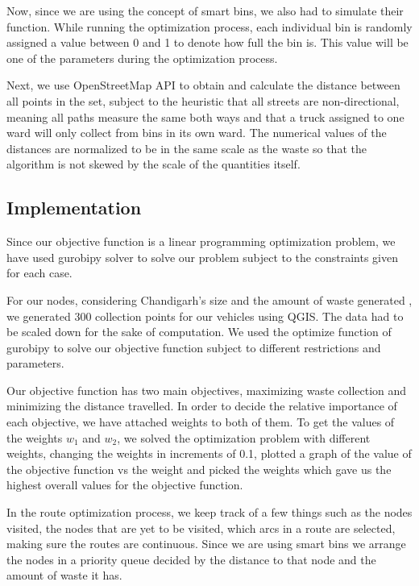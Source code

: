 \documentclass[12pt]{article}
\begin{document}
Now, since we are using the concept of smart bins, we also had to simulate their function. While running the optimization process, each individual bin is randomly assigned a value between 0 and 1 to denote how full the bin is. This value will be one of the parameters during the optimization process.

Next, we use OpenStreetMap API to obtain and calculate the distance between all points in the set, subject to the heuristic that all streets are non-directional, meaning all paths measure the same both ways and that a truck assigned to one ward will only collect from bins in its own ward. The numerical values of the distances are normalized to be in the same scale as the waste so that the algorithm is not skewed by the scale of the quantities itself.

\subsection{Implementation}

Since our objective function is a linear programming optimization problem, we have used gurobipy solver to solve our problem subject to the constraints given for each case.

For our nodes, considering Chandigarh's size and the amount of waste generated \cite{ravindra2015system}, we generated 300 collection points for our vehicles using QGIS. The data had to be scaled down for the sake of computation. We used the optimize function of gurobipy to solve our objective function subject to different restrictions and parameters.

Our objective function has two main objectives, maximizing waste collection and minimizing the distance travelled. In order to decide the relative importance of each objective, we have attached weights to both of them. To get the values of the weights $w_1$ and $w_2$, we solved the optimization problem with different weights, changing the weights in increments of 0.1, plotted a graph of the value of the objective function vs the weight and picked the weights which gave us the highest overall values for the objective function.       

In the route optimization process, we keep track of a few things such as the nodes visited, the nodes that are yet to be visited, which arcs in a route are selected, making sure the routes are continuous. Since we are using smart bins we arrange the nodes in a priority queue decided by the distance to that node and the amount of waste it has.
\end{document}
